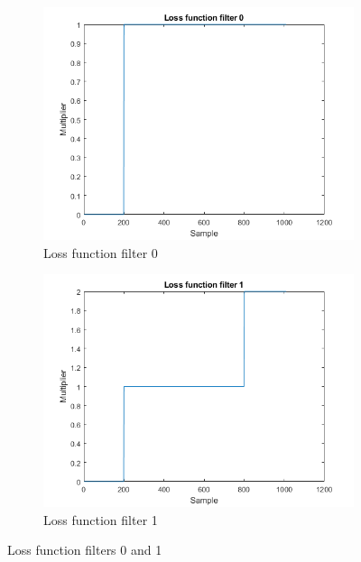 \begin{figure}
    \centering
    \begin{subfigure}[b]{.45\textwidth}
        \centering
        \includegraphics[width=\textwidth]{figures/loss-0.png}
        \caption{Loss function filter 0}
        \label{sfig:me:loss0}
    \end{subfigure}
    \hfill
    \begin{subfigure}[b]{.45\textwidth}
        \centering
        \includegraphics[width=\textwidth]{figures/loss-1.png}
        \caption{Loss function filter 1}
        \label{sfig:me:loss1}
    \end{subfigure}
    \caption{Loss function filters 0 and 1}
    \label{fig:me:loss01}
\end{figure}

